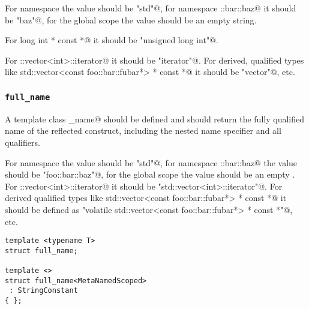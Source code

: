 For namespace \verb@std@ the value should be \verb@"std"@, for namespace
\verb@foo::bar::baz@ it should be \verb@"baz"@, for the global scope the
value should be an empty string.

For \verb@unsigned long int * const *@ it should be \verb@"unsigned long int"@.

For \verb@std::vector<int>::iterator@ it should be \verb@"iterator"@. For derived,
qualified types like \verb@volatile std::vector<const foo::bar::fubar*> * const *@
it should be \verb@"vector"@, etc.

\subsubsection{\texttt{full\_name}}

A template class \verb@full_name@ should be defined and should return the fully
qualified name of the reflected construct, including the nested name specifier
and all qualifiers.

For namespace \verb@std@ the value 
should be \verb@"std"@, for namespace \verb@foo::bar::baz@ the value should
be \verb@"foo::bar::baz"@, for the global scope the value should be an empty
.
For \verb@std::vector<int>::iterator@ it should be \verb@"std::vector<int>::iterator"@.
For derived qualified types like
\verb@volatile std::vector<const foo::bar::fubar*> * const *@ it should be defined as
\verb@"volatile std::vector<const foo::bar::fubar*> * const *"@, etc.

\begin{verbatim}
template <typename T>
struct full_name;

template <>
struct full_name<MetaNamedScoped>
 : StringConstant
{ };
\end{verbatim}


